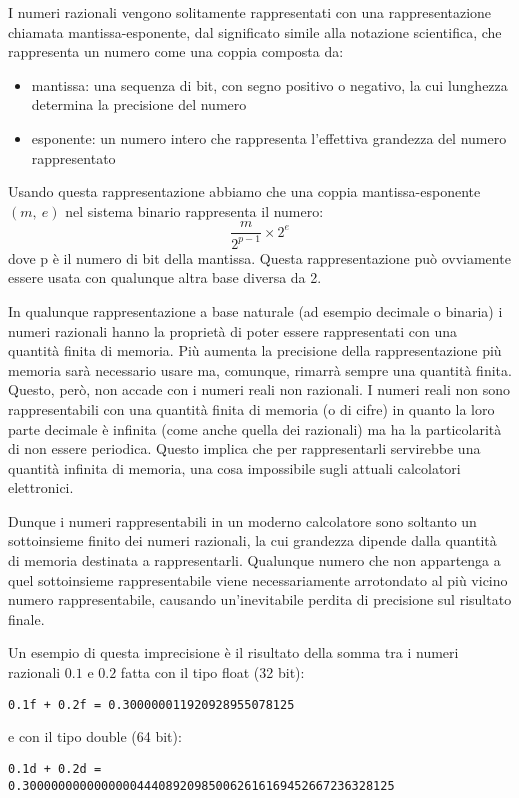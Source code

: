 \documentclass[Lau]{sapthesis}
\newcommand{\code}[1]{\colorbox{light-gray}{\texttt{#1}}}
\begin{document}
I numeri razionali vengono solitamente rappresentati con una rappresentazione 
chiamata mantissa-esponente, dal significato simile alla notazione 
scientifica, che rappresenta un numero come una coppia composta da:
\begin{itemize}
	\item mantissa: una sequenza di bit, con segno positivo o negativo, la cui 
lunghezza determina la precisione del numero
	\item esponente: un numero intero che rappresenta l'effettiva grandezza del 
numero rappresentato
\end{itemize}
Usando questa rappresentazione abbiamo che una coppia mantissa-esponente $\left(m,\ e\right)$ nel sistema binario rappresenta il numero:
$$\frac{m}{2^{p-1}} \times 2^e$$
dove p è il numero di bit della mantissa. Questa rappresentazione può ovviamente essere usata con qualunque altra base 
diversa da 2.

\medskip

In qualunque rappresentazione a base naturale (ad esempio decimale o binaria) i numeri razionali hanno la proprietà di poter essere rappresentati con una 
quantità finita di memoria. Più aumenta la precisione della rappresentazione più memoria sarà necessario usare ma, comunque, 
rimarrà sempre una quantità finita. Questo, però, non accade con i numeri 
reali non razionali. I numeri reali non sono rappresentabili con una quantità 
finita di memoria (o di cifre) in quanto la loro parte decimale è infinita (come 
anche quella dei razionali) ma ha la particolarità di non essere periodica. 
Questo implica che per rappresentarli servirebbe una quantità infinita di 
memoria, una cosa impossibile sugli attuali calcolatori elettronici.

Dunque i numeri rappresentabili in un moderno calcolatore sono soltanto un 
sottoinsieme finito dei numeri razionali, la cui grandezza dipende dalla quantità di 
memoria destinata a rappresentarli. Qualunque numero che non appartenga a quel 
sottoinsieme rappresentabile viene necessariamente arrotondato al più vicino 
numero rappresentabile, causando un'inevitabile perdita di precisione sul 
risultato finale.

Un esempio di questa imprecisione è il risultato della somma tra i numeri razionali $0.1$ e $0.2$ fatta con il tipo float (32 bit):
\begin{center}
\code{0.1f + 0.2f = 0.300000011920928955078125}
\end{center}
e con il tipo double (64 bit):
\begin{center}
\code{0.1d + 0.2d =}\\
\code{0.3000000000000000444089209850062616169452667236328125}
\end{center}
\end{document}
